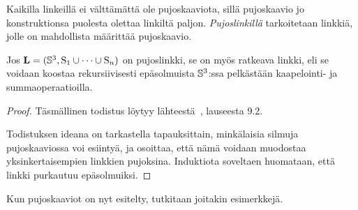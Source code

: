 Kaikilla linkeillä ei välttämättä ole pujoskaaviota, sillä pujoskaavio jo konstruktionsa puolesta olettaa linkiltä paljon. \emph{Pujoslinkillä} tarkoitetaan linkkiä, jolle on mahdollista määrittää pujoskaavio.
\begin{lemma}
    \label{lemma:pujoslinkki-on-ratkeava}
    Jos $\linkki=(\S^3,\solmu_1\cup\cdots\cup\solmu_n)$ on pujoslinkki, se on myös ratkeava linkki, eli se voidaan koostaa rekursiivisesti epäsolmuista $\S^3$:ssa pelkästään kaapelointi- ja summaoperaatioilla.
\end{lemma}
\begin{proof}
    Täsmällinen todistus löytyy lähteestä~\citep{EN1985}, lauseesta 9.2.

    Todistuksen ideana on tarkastella tapauksittain, minkälaisia silmuja pujoskaaviossa voi esiintyä, ja osoittaa, että nämä voidaan muodostaa yksinkertaisempien linkkien pujoksina. Induktiota soveltaen huomataan, että linkki purkautuu epäsolmuiksi.
\end{proof}

Kun pujoskaaviot on nyt esitelty, tutkitaan joitakin esimerkkejä.

